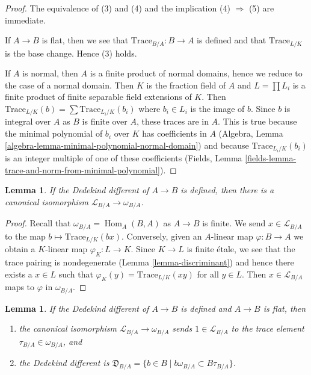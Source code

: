 \documentclass{stacks-project}
\theoremstyle{plain}
\newtheorem{lemma}[subsection]{Lemma}
\theoremstyle{definition}
\theoremstyle{remark}
\numberwithin{equation}{subsection}
\def\Hom{\mathop{\mathrm{Hom}}\nolimits}
\begin{document}
\begin{proof}
The equivalence of (3) and (4) and the
implication (4) $\Rightarrow$ (5) are immediate.

\medskip\noindent
If $A \to B$ is flat, then we see that $\text{Trace}_{B/A} : B \to A$ is
defined and that $\text{Trace}_{L/K}$ is the base change. Hence (3) holds.

\medskip\noindent
If $A$ is normal, then $A$ is a finite product of normal domains,
hence we reduce to the case of a normal domain. Then $K$ is
the fraction field of $A$ and $L = \prod L_i$ is a finite product of
finite separable field extensions of $K$. Then
$\text{Trace}_{L/K}(b) = \sum \text{Trace}_{L_i/K}(b_i)$
where $b_i \in L_i$ is the image of $b$.
Since $b$ is integral over $A$ as $B$ is finite over $A$,
these traces are in $A$. This is true because the
minimal polynomial of $b_i$ over $K$ has coefficients in $A$
(Algebra, Lemma \ref{algebra-lemma-minimal-polynomial-normal-domain})
and because $\text{Trace}_{L_i/K}(b_i)$ is an
integer multiple of one of these coefficients
(Fields, Lemma \ref{fields-lemma-trace-and-norm-from-minimal-polynomial}).
\end{proof}

\begin{lemma}
\label{lemma-dedekind-complementary-module}
If the Dedekind different of $A \to B$ is defined, then
there is a canonical isomorphism
$\mathcal{L}_{B/A} \to \omega_{B/A}$.
\end{lemma}

\begin{proof}
Recall that $\omega_{B/A} = \Hom_A(B, A)$ as $A \to B$ is finite.
We send $x \in \mathcal{L}_{B/A}$ to the map
$b \mapsto \text{Trace}_{L/K}(bx)$.
Conversely, given an $A$-linear map $\varphi : B \to A$
we obtain a $K$-linear map $\varphi_K : L \to K$. Since $K \to L$ is finite
\'etale, we see that the trace pairing is nondegenerate
(Lemma \ref{lemma-discriminant}) and hence there exists a $x \in L$ such that
$\varphi_K(y) = \text{Trace}_{L/K}(xy)$ for all $y \in L$.
Then $x \in \mathcal{L}_{B/A}$ maps to $\varphi$ in $\omega_{B/A}$.
\end{proof}

\begin{lemma}
\label{lemma-flat-dedekind-complementary-module-trace}
If the Dedekind different of $A \to B$ is defined and $A \to B$ is flat, then
\begin{enumerate}
\item the canonical isomorphism $\mathcal{L}_{B/A} \to \omega_{B/A}$
sends $1 \in \mathcal{L}_{B/A}$ to the trace element
$\tau_{B/A} \in \omega_{B/A}$, and
\item the Dedekind different is
$\mathfrak{D}_{B/A} = \{b \in B \mid b\omega_{B/A} \subset B\tau_{B/A}\}$.
\end{enumerate}
\end{lemma}
\end{document}
